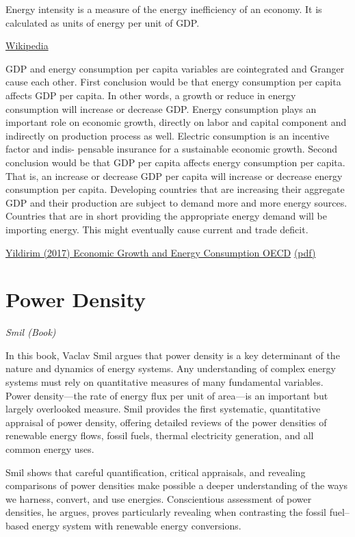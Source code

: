 \documentclass[
]{book}
\begin{document}
Energy intensity is a measure of the energy inefficiency of an economy. It is calculated as units of energy per unit of GDP.

\href{https://en.wikipedia.org/wiki/Energy_intensity}{Wikipedia}

GDP and energy consumption per capita variables are cointegrated and Granger
cause each other. First conclusion would be that energy consumption per capita
affects GDP per capita. In other words, a growth or reduce in energy consumption
will increase or decrease GDP. Energy consumption plays an important role on
economic growth, directly on labor and capital component and indirectly on
production process as well. Electric consumption is an incentive factor and indis-
pensable insurance for a sustainable economic growth. Second conclusion would be
that GDP per capita affects energy consumption per capita. That is, an increase or
decrease GDP per capita will increase or decrease energy consumption per capita.
Developing countries that are increasing their aggregate GDP and their production
are subject to demand more and more energy sources. Countries that are in short
providing the appropriate energy demand will be importing energy. This might
eventually cause current and trade deficit.

\href{https://www.researchgate.net/publication/316961845_Economic_Growth_and_Energy_Consumption_for_OECD_Countries}{Yildirim (2017) Economic Growth and Energy Consumption OECD}
\href{pdf/Yildirim_2017_Economic_Growth_and_Energy_Consumption_OECD.pdf}{(pdf)}

\hypertarget{power-density}{%
\section{Power Density}\label{power-density}}

\emph{Smil (Book)}

In this book, Vaclav Smil argues that power density is a key determinant of the nature and dynamics of energy systems. Any understanding of complex energy systems must rely on quantitative measures of many fundamental variables. Power density---the rate of energy flux per unit of area---is an important but largely overlooked measure. Smil provides the first systematic, quantitative appraisal of power density, offering detailed reviews of the power densities of renewable energy flows, fossil fuels, thermal electricity generation, and all common energy uses.

Smil shows that careful quantification, critical appraisals, and revealing comparisons of power densities make possible a deeper understanding of the ways we harness, convert, and use energies. Conscientious assessment of power densities, he argues, proves particularly revealing when contrasting the fossil fuel--based energy system with renewable energy conversions.
\end{document}
